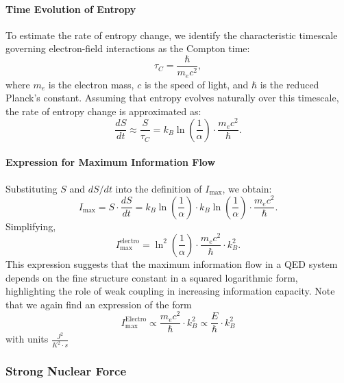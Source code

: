 \documentclass[12pt]{article}
\begin{document}
\paragraph{Time Evolution of Entropy}

To estimate the rate of entropy change, we identify the characteristic timescale governing electron-field interactions as the Compton time:
\begin{equation}
    \tau_C = \frac{\hbar}{m_e c^2},
\end{equation}
where $m_e$ is the electron mass, $c$ is the speed of light, and $\hbar$ is the reduced Planck’s constant. Assuming that entropy evolves naturally over this timescale, the rate of entropy change is approximated as:
\begin{equation}
    \frac{dS}{dt} \approx \frac{S}{\tau_C} = k_B \ln\left(\frac{1}{\alpha}\right) \cdot \frac{m_e c^2}{\hbar}.
\end{equation}

\paragraph{Expression for Maximum Information Flow}

Substituting $S$ and $dS/dt$ into the definition of $I_{\max}$, we obtain:
\begin{equation}
    I_{\max} = S \cdot \frac{dS}{dt} = k_B \ln\left(\frac{1}{\alpha}\right) \cdot k_B \ln\left(\frac{1}{\alpha}\right) \cdot \frac{m_e c^2}{\hbar}.
\end{equation}
Simplifying,
\begin{equation}
    I_{\max}^{\text{electro}} = \ln^2\left(\frac{1}{\alpha}\right) \cdot \frac{m_e c^2}{\hbar} \cdot k_B^2.
\end{equation}
This expression suggests that the maximum information flow in a QED system depends on the fine structure constant in a squared logarithmic form, highlighting the role of weak coupling in increasing information capacity. Note that we again find an expression of the form
\begin{equation}
    I_{\max}^{\text{Electro}} \propto \frac{m_e c^2}{\hbar} \cdot k_B^2 \propto \frac{E}{\hbar} \cdot k_B^2 
\end{equation}
with units $\frac{J^2}{K^2 \cdot s}$

\subsubsection{Strong Nuclear Force}
\end{document}
